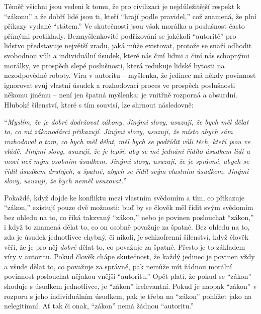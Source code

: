 \documentclass{book}
\begin{document}
Téměř všichni jsou vedeni k tomu, že pro civilizaci je nejdůležitější respekt k \enquote{zákonu} a že dobří lidé jsou ti, kteří \enquote{hrají podle pravidel,} což znamená, že plní příkazy vydané \enquote{státem.} Ve skutečnosti jsou však morálka a poslušnost často přímými protiklady. Bezmyšlenkovité podřizování se jakékoli \enquote{autoritě} pro lidstvo představuje největší zradu, jaká může existovat, protože se snaží odhodit svobodnou vůli a individuální úsudek, které nás činí lidmi a činí nás schopnými morálky, ve prospěch slepé poslušnosti, která redukuje lidské bytosti na nezodpovědné roboty. Víra v autoritu -- myšlenka, že jedinec má někdy povinnost ignorovat svůj vlastní úsudek a rozhodovací proces ve prospěch poslušnosti někomu jinému -- není jen špatná myšlenka; je vnitřně rozporná a absurdní. Hluboké šílenství, které s tím souvisí, lze shrnout následovně:

\enquote{\emph{Myslím, že je dobré dodržovat zákony. Jinými slovy, usuzuji, že bych měl dělat to, co mi zákonodárci přikazují. Jinými slovy, usuzuji, že místo abych sám rozhodoval o tom, co bych měl dělat, měl bych se podřídit vůli těch, kteří jsou ve vládě. Jinými slovy, usuzuji, že je lepší, aby se mé jednání řídilo úsudkem lidí u moci než mým osobním úsudkem. Jinými slovy, usuzuji, že je správné, abych se řídil úsudkem druhých, a špatné, abych se řídil svým vlastním úsudkem. Jinými slovy, usuzuji, že bych neměl usuzovat.}}

Pokaždé, když dojde ke konfliktu mezi vlastním svědomím a tím, co přikazuje \enquote{zákon,} existují pouze dvě možnosti: buď by se člověk měl řídit svým svědomím bez ohledu na to, co říká takzvaný \enquote{zákon,} nebo je povinen poslouchat \enquote{zákon,} i když to znamená dělat to, co on osobně považuje za špatné. Bez ohledu na to, zda je úsudek jednotlivce chybný, či nikoli, je schizofrenní šílenství, když člověk věří, že je pro něj \emph{dobré} dělat to, co považuje za špatné. Přesto je to základem víry v autoritu. Pokud člověk chápe skutečnost, že každý jedinec je povinen vždy a všude dělat to, co považuje za správné, pak nemůže mít žádnou morální povinnost poslouchat nějakou vnější \enquote{autoritu.} Opět platí, že pokud se \enquote{zákon} shoduje s úsudkem jednotlivce, je \enquote{zákon} irelevantní. Pokud je naopak \enquote{zákon} v rozporu s jeho individuálním úsudkem, pak je třeba na \enquote{zákon} pohlížet jako na nelegitimní. Ať tak či onak, \enquote{zákon} nemá žádnou \enquote{autoritu.}
\end{document}
